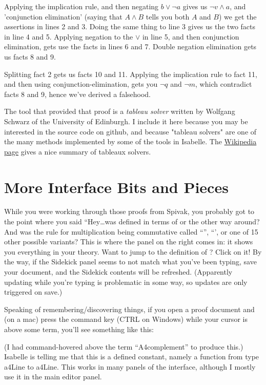Applying the implication rule, and then negating $b \vee \neg a$ gives us $\neg v \wedge a$, and 'conjunction elimination' (saying that $A \wedge B$ tells you both $A$ and $B$) we get the assertions in lines 2 and 3. Doing the same thing to line 3 gives us the two facts in line 4 and 5. Applying negation to the $\vee$ in line 5, and then conjunction elimination, gets use the facts in lines 6 and 7. Double negation elimination gets us facts 8 and 9. 

Splitting fact 2 gets us facts 10 and 11. Applying the implication rule to fact 11, and then using conjunction-elimination, gets you $\neg q$ and $\neg m$, which contradict facts 8 and 9, hence we've derived a falsehood. 

The tool that provided that proof is a \emph{tableau solver} written by Wolfgang Schwarz of the University of Edinburgh. I include it here because you may be interested in the source code on github, and because "tableau solvers" are one of the many methods implemented by some of the tools in Isabelle. The  \href{https://en.wikipedia.org/wiki/Method_of_analytic_tableaux#:~:text=A%20tableau%20checks%20whether%20a,is%20unsatisfiable}{Wikipedia page} gives a nice summary of tableaux solvers. 

\section{More Interface Bits and Pieces}

While you were working through those proofs from Spivak, you probably got to the point where you said ``Hey\ldots was  defined in terms of  or the other way around? And was the rule for multiplication being commutative called ``'', ``', or one of 15 other possible variants? This is where the  panel on the right comes in: it shows you everything in your theory. Want to jump to the definition of ? Click on it! By the way, if the Sidekick panel seems to not match what you've been typing, save your document, and the Sidekick contents will be refreshed. (Apparently updating while you're typing is problematic in some way, so updates are only triggered on save.)

Speaking of remembering/discovering things, if you open a proof document and (on a mac) press the command key (CTRL on Windows) while your cursor is above some term, you'll see something like this:



(I had command-hovered above the term ``A4complement'' to produce this.) Isabelle is telling me that this is a defined constant, namely a function from type a4Line to a4Line. This works in many panels of the interface, although I mostly use it in the main editor panel. 

